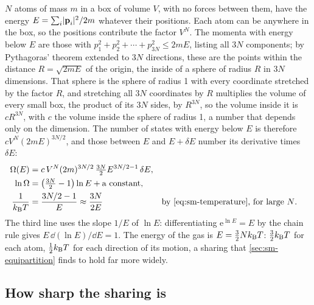 $N$ atoms of mass $m$ in a box of volume $V$, with no forces between them,
have the energy $E = \sum_i\lvert\bm{\mathrm{p}}_i\rvert^2/2m$ whatever their
positions. Each atom can be anywhere in the box, so the positions
contribute the factor $V^N$. The momenta with energy below $E$ are those
with $p_1^2 + p_2^2 + \dotsb + p_{3N}^2 \le 2mE$, listing all $3N$
components; by Pythagoras' theorem extended to $3N$ directions, these are
the points within the distance $R = \sqrt{2mE}$ of the origin, the inside
of a sphere of radius $R$ in $3N$ dimensions. That sphere is the sphere of
radius 1 with every coordinate stretched by the factor $R$, and
stretching all $3N$ coordinates by $R$ multiplies the volume of every
small box, the product of its $3N$ sides, by $R^{3N}$, so the volume
inside it is $cR^{3N}$, with $c$ the volume inside the sphere of radius 1,
a number that depends only on the dimension.
The number of states with energy below $E$ is therefore $cV^N(2mE)^{3N/2}$,
and those between $E$ and $E + \delta E$ number its derivative times
$\delta E$:
\begin{align*}
   \Omega(E) &= c\,V^N(2m)^{3N/2}\,\tfrac{3N}{2}E^{3N/2 - 1}\,\delta E ,\\
   \ln\Omega &= \bigl(\tfrac{3N}{2} - 1\bigr)\ln E + \text{a constant} ,\\
   \frac{1}{\kB T} &= \frac{3N/2 - 1}{E} \approx \frac{3N}{2E}
   && \text{by \cref{eq:sm-temperature}, for large $N$.}
\end{align*}
The third line uses the slope $1/E$ of $\ln E$: differentiating
$\mathrm{e}^{\ln E} = E$ by the chain rule gives $E\,\dd(\ln E)/\dd E =
1$.
The energy of the gas is $E = \frac32Nk_{\mathrm{B}} T$: $\frac32k_{\mathrm{B}} T$ for each atom,
$\frac12k_{\mathrm{B}} T$ for each direction of its motion, a sharing that
\cref{sec:sm-equipartition} finds to hold far more widely.

\subsection*{How sharp the sharing is}

